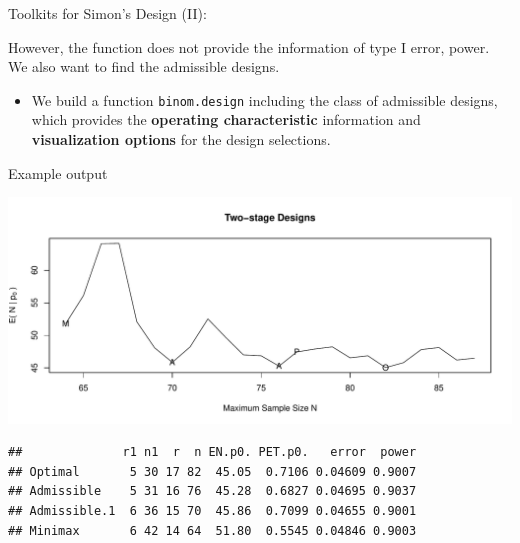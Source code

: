 \begin{frame}[fragile]{Toolkits for Simon's Design (II):}

However, the function does not provide the information of type I error,
power. We also want to find the admissible designs.

\begin{itemize}
\tightlist
\item
  We build a function \texttt{binom.design} including the class of
  admissible designs, which provides the \textbf{operating
  characteristic} information and \textbf{visualization options} for the
  design selections.
\end{itemize}

\begin{Shaded}
\begin{Highlighting}[]
\NormalTok{(}\NormalTok{)}
\NormalTok{(}\NormalTok{, }\NormalTok{, }\NormalTok{, }
       \NormalTok{, } \NormalTok{, } 
\end{Highlighting}
\end{Shaded}

\end{frame}

\begin{frame}[fragile]{Example output}

\includegraphics{bayesdesign_files/figure-beamer/unnamed-chunk-4-1.pdf}

\begin{verbatim}
##              r1 n1  r  n EN.p0. PET.p0.   error  power
## Optimal       5 30 17 82  45.05  0.7106 0.04609 0.9007
## Admissible    5 31 16 76  45.28  0.6827 0.04695 0.9037
## Admissible.1  6 36 15 70  45.86  0.7099 0.04655 0.9001
## Minimax       6 42 14 64  51.80  0.5545 0.04846 0.9003
\end{verbatim}

\end{frame}

